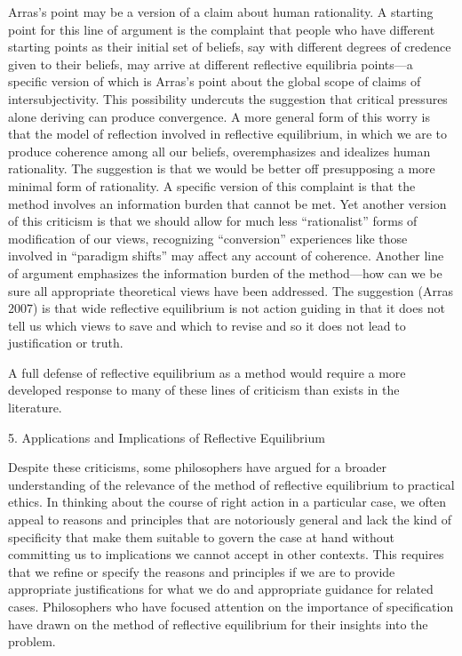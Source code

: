 \documentclass[]{article}
\begin{document}
Arras's point may be a version of a claim about human rationality. A
starting point for this line of argument is the complaint that people
who have different starting points as their initial set of beliefs, say
with different degrees of credence given to their beliefs, may arrive at
different reflective equilibria points---a specific version of which is
Arras's point about the global scope of claims of intersubjectivity.
This possibility undercuts the suggestion that critical pressures alone
deriving can produce convergence. A more general form of this worry is
that the model of reflection involved in reflective equilibrium, in
which we are to produce coherence among all our beliefs, overemphasizes
and idealizes human rationality. The suggestion is that we would be
better off presupposing a more minimal form of rationality. A specific
version of this complaint is that the method involves an information
burden that cannot be met. Yet another version of this criticism is that
we should allow for much less ``rationalist'' forms of modification of
our views, recognizing ``conversion'' experiences like those involved in
``paradigm shifts'' may affect any account of coherence. Another line of
argument emphasizes the information burden of the method---how can we be
sure all appropriate theoretical views have been addressed. The
suggestion (Arras 2007) is that wide reflective equilibrium is not
action guiding in that it does not tell us which views to save and which
to revise and so it does not lead to justification or truth.

A full defense of reflective equilibrium as a method would require a
more developed response to many of these lines of criticism than exists
in the literature.

\protect\hypertarget{AppImpRefEqu}{}{5. Applications and Implications of
Reflective Equilibrium}

Despite these criticisms, some philosophers have argued for a broader
understanding of the relevance of the method of reflective equilibrium
to practical ethics. In thinking about the course of right action in a
particular case, we often appeal to reasons and principles that are
notoriously general and lack the kind of specificity that make them
suitable to govern the case at hand without committing us to
implications we cannot accept in other contexts. This requires that we
refine or specify the reasons and principles if we are to provide
appropriate justifications for what we do and appropriate guidance for
related cases. Philosophers who have focused attention on the importance
of specification have drawn on the method of reflective equilibrium for
their insights into the problem.
\end{document}

